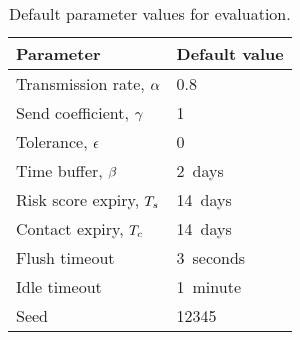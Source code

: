 \begin{table}[htbp]
  \centering
  \begin{tabular}{ll}
    \toprule
    Parameter & Default value \\
    \midrule
    Transmission rate, $\alpha$ & \num{0.8} \\
    Send coefficient, $\gamma$ & \num{1} \\
    Tolerance, $\epsilon$ & \num{0} \\
    Time buffer, $\beta$ & \qty{2}{days} \\
    Risk score expiry, $T_s$ & \qty{14}{days} \\
    Contact expiry, $T_c$ & \qty{14}{days} \\
    Flush timeout & \qty{3}{seconds} \\
    Idle timeout & \qty{1}{minute} \\
    Seed & \num{12345} \\
    \bottomrule
  \end{tabular}
  \caption[Default parameter values for evaluation]{Default parameter values for evaluation.}
  \label{tab:default-parameters}
\end{table}

